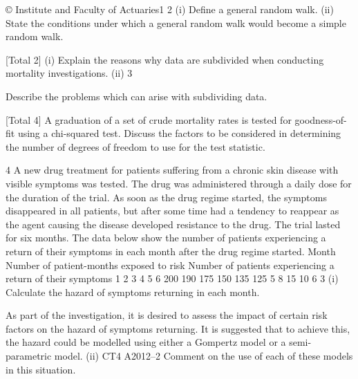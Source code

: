© Institute and Faculty of Actuaries1
2
(i) Define a general random walk.
(ii) State the conditions under which a general random walk would become a
simple random walk.

[Total 2]
(i) Explain the reasons why data are subdivided when conducting mortality
investigations.
(ii)
3

Describe the problems which can arise with subdividing data.


[Total 4]
A graduation of a set of crude mortality rates is tested for goodness-of-fit using a
chi-squared test.
Discuss the factors to be considered in determining the number of degrees of freedom
to use for the test statistic.

4
A new drug treatment for patients suffering from a chronic skin disease with visible
symptoms was tested. The drug was administered through a daily dose for the
duration of the trial. As soon as the drug regime started, the symptoms disappeared in
all patients, but after some time had a tendency to reappear as the agent causing the
disease developed resistance to the drug. The trial lasted for six months.
The data below show the number of patients experiencing a return of their symptoms
in each month after the drug regime started.
Month Number of patient-months
exposed to risk Number of patients experiencing
a return of their symptoms
1
2
3
4
5
6 200
190
175
150
135
125 5
8
15
10
6
3
(i)
Calculate the hazard of symptoms returning in each month.

As part of the investigation, it is desired to assess the impact of certain risk factors on
the hazard of symptoms returning. It is suggested that to achieve this, the hazard
could be modelled using either a Gompertz model or a semi-parametric model.
(ii)
CT4 A2012–2
Comment on the use of each of these models in this situation.


